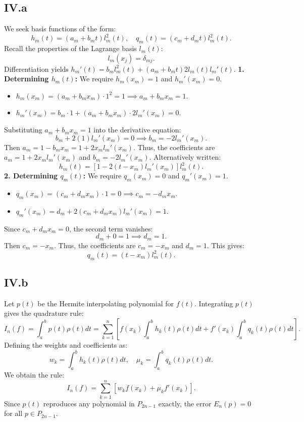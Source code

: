\documentclass[a4paper]{article}
\begin{document}
\subsection*{IV.a}
We seek basis functions of the form:
\[
h_m(t) = (a_m + b_m t) l_m^2(t), \quad q_m(t) = (c_m + d_m t) l_m^2(t).
\]
Recall the properties of the Lagrange basis $l_m(t)$:
\[
l_m(x_j) = \delta_{mj}.
\]
Differentiation yields $h_m'(t) = b_m l_m^2(t) + (a_m + b_m t) 2 l_m(t) l_m'(t)$.
\textbf{1. Determining $h_m(t)$:}
We require $h_m(x_m) = 1$ and $h_m'(x_m) = 0$.
\begin{itemize}
    \item $h_m(x_m) = (a_m + b_m x_m) \cdot 1^2 = 1 \implies a_m + b_m x_m = 1$.
    \item $h_m'(x_m) = b_m \cdot 1 + (a_m + b_m x_m) \cdot 2 l_m'(x_m) = 0$.
\end{itemize}
Substituting $a_m + b_m x_m = 1$ into the derivative equation:
\[
b_m + 2(1) l_m'(x_m) = 0 \implies b_m = -2 l_m'(x_m).
\]
Then $a_m = 1 - b_m x_m = 1 + 2 x_m l_m'(x_m)$.
Thus, the coefficients are $a_m = 1 + 2 x_m l_m'(x_m)$ and $b_m = -2 l_m'(x_m)$.
Alternatively written:
\[
h_m(t) = [1 - 2(t - x_m) l_m'(x_m)] l_m^2(t).
\]
\textbf{2. Determining $q_m(t)$:}
We require $q_m(x_m) = 0$ and $q_m'(x_m) = 1$.
\begin{itemize}
    \item $q_m(x_m) = (c_m + d_m x_m) \cdot 1 = 0 \implies c_m = -d_m x_m$.
    \item $q_m'(x_m) = d_m + 2(c_m + d_m x_m) l_m'(x_m) = 1$.
\end{itemize}
Since $c_m + d_m x_m = 0$, the second term vanishes:
\[
d_m + 0 = 1 \implies d_m = 1.
\]
Then $c_m = -x_m$.
Thus, the coefficients are $c_m = -x_m$ and $d_m = 1$.
This gives:
\[
q_m(t) = (t - x_m) l_m^2(t).
\]

\subsection*{IV.b}
Let $p(t)$ be the Hermite interpolating polynomial for $f(t)$. Integrating $p(t)$ gives the quadrature rule:
\[
I_n(f) = \int_a^b p(t) \rho(t) dt = \sum_{k=1}^n \left[ f(x_k) \int_a^b h_k(t) \rho(t) dt + f'(x_k) \int_a^b q_k(t) \rho(t) dt \right].
\]
Defining the weights and coefficients as:
\[
w_k = \int_a^b h_k(t) \rho(t) dt, \quad \mu_k = \int_a^b q_k(t) \rho(t) dt.
\]
We obtain the rule:
\[
I_n(f) = \sum_{k=1}^n [w_k f(x_k) + \mu_k f'(x_k)].
\]
Since $p(t)$ reproduces any polynomial in ${P}_{2n-1}$ exactly, the error $E_n(p) = 0$ for all $p \in {P}_{2n-1}$.
\end{document}
